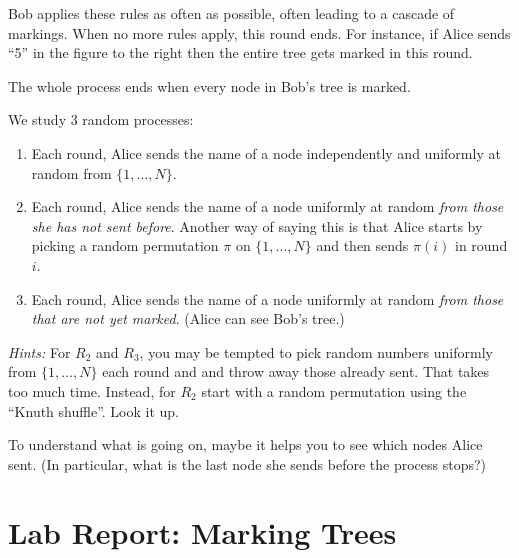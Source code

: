 \documentclass{tufte-handout}
\begin{document}
Bob applies these rules as often as possible, often leading to a
cascade of markings.
When no more rules apply, this round ends. 
For instance, if Alice sends ``5'' in the figure to the right then the
entire tree gets marked in this round.
\begin{marginfigure}
\end{marginfigure}
The whole process ends when
every node in Bob's tree is marked.



We study 3 random processes:
\begin{enumerate}
\item Each round, Alice sends the name of a node independently and
  uniformly at random from $\{1,\ldots, N\}$.
\item Each round, Alice sends the name of a node uniformly at
  random \emph{from those she has not sent before}.
  Another way of saying this is that Alice starts by picking a random
  permutation $\pi$ on $\{1,\ldots, N\}$ and then sends $\pi(i)$ in
  round $i$.
\item Each round, Alice sends the name of a node uniformly at random
  \emph{from those that are not yet marked}. (Alice can see Bob's tree.)
\end{enumerate}


\emph{Hints:} For $R_2$ and $R_3$, you may be tempted to pick random
numbers uniformly from $\{1,\ldots,N\}$ each round and and throw away
those already sent. That takes too much time.
Instead, for $R_2$ start with a random permutation using the ``Knuth
shuffle''.
Look it up.

To understand what is going on, maybe it helps you to see which nodes
Alice sent. (In particular, what is the last node she sends before the
process stops?)



\newpage
\section{Lab Report: Marking Trees}
\end{document}
